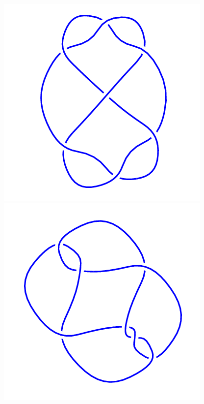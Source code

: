 \begin{figure}[H]
	\begin{minipage}[b]{.18\linewidth}
		\centering
		\includegraphics[width=\linewidth]{../data/7_4.png}
	\end{minipage}
	\begin{minipage}[b]{.18\linewidth}
		\centering
		\includegraphics[width=\linewidth]{../data/7_5.png}

\end{minipage}
\end{figure}
